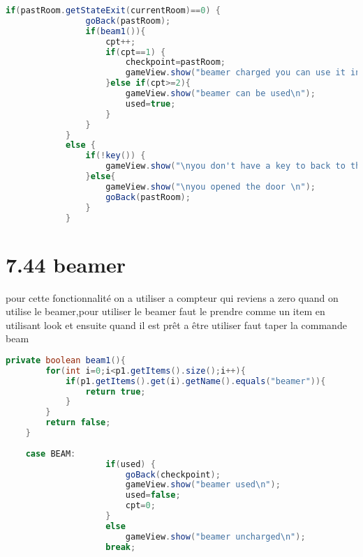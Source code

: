 \documentclass[a4paper , 10pt]{article}
\begin{document}
\begin{lstlisting}[language=Java]
            if(pastRoom.getStateExit(currentRoom)==0) {
                goBack(pastRoom);
                if(beam1()){
                    cpt++;
                    if(cpt==1) {
                        checkpoint=pastRoom;
                        gameView.show("beamer charged you can use it in the next room");
                    }else if(cpt>=2){
                        gameView.show("beamer can be used\n");
                        used=true;
                    }
                }
            }
            else {
                if(!key()) {
                    gameView.show("\nyou don't have a key to back to this room use look to find a key \n");
                }else{
                    gameView.show("\nyou opened the door \n");
                    goBack(pastRoom);
                }
            }
\end{lstlisting}
\section{7.44 beamer}
pour cette fonctionnalité on a utiliser a compteur qui reviens a zero quand on utilise le beamer,pour utiliser le beamer faut le prendre comme un item en utilisant look et ensuite quand il est prêt a être utiliser faut taper la commande beam
\begin{lstlisting}[language=Java]
    private boolean beam1(){
        for(int i=0;i<p1.getItems().size();i++){
            if(p1.getItems().get(i).getName().equals("beamer")){
                return true;
            }
        }
        return false;
    }
    
    case BEAM:
                    if(used) {
                        goBack(checkpoint);
                        gameView.show("beamer used\n");
                        used=false;
                        cpt=0;
                    }
                    else
                        gameView.show("beamer uncharged\n");
                    break;
                
                    
\end{lstlisting}
\end{document}
